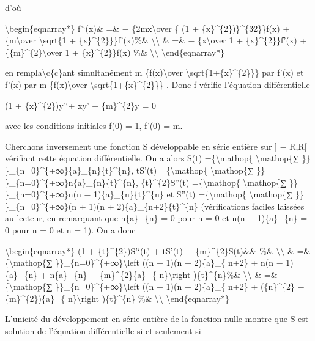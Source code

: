 \documentclass[]{article}
\begin{document}
d'où

\textbackslash{}begin\{eqnarray*\} f'`(x)\& =\& −
\{2mx\textbackslash{}over \{ (1 + \{x\}\^{}\{2\})\}\^{}\{3∕2\}\}f(x) +
\{m\textbackslash{}over \textbackslash{}sqrt\{1 +
\{x\}\^{}\{2\}\}\}f'(x)\%\& \textbackslash{}\textbackslash{} \& =\& −
\{x\textbackslash{}over 1 + \{x\}\^{}\{2\}\}f'(x) +
\{\{m\}\^{}\{2\}\textbackslash{}over 1 + \{x\}\^{}\{2\}\}f(x) \%\&
\textbackslash{}\textbackslash{} \textbackslash{}end\{eqnarray*\}

en rempla\textbackslash{}c\{c\}ant simultanément m
\{f(x)\textbackslash{}over \textbackslash{}sqrt\{1+\{x\}\^{}\{2\}\}\}
par f'(x) et f'(x) par m \{f(x)\textbackslash{}over
\textbackslash{}sqrt\{1+\{x\}\^{}\{2\}\}\} . Donc f vérifie l'équation
différentielle

(1 + \{x\}\^{}\{2\})y'`+ xy' − \{m\}\^{}\{2\}y = 0

avec les conditions initiales f(0) = 1, f'(0) = m.

Cherchons inversement une fonction S développable en série entière sur
{]} − R,R{[} vérifiant cette équation différentielle. On a alors S(t)
=\{\textbackslash{}mathop\{ \textbackslash{}mathop\{∑ \}\}
\}\_\{n=0\}\^{}\{+∞\}\{a\}\_\{n\}\{t\}\^{}\{n\}, tS'(t)
=\{\textbackslash{}mathop\{ \textbackslash{}mathop\{∑ \}\}
\}\_\{n=0\}\^{}\{+∞\}n\{a\}\_\{n\}\{t\}\^{}\{n\}, \{t\}\^{}\{2\}S''(t)
=\{\textbackslash{}mathop\{ \textbackslash{}mathop\{∑ \}\}
\}\_\{n=0\}\^{}\{+∞\}n(n − 1)\{a\}\_\{n\}\{t\}\^{}\{n\} et S''(t)
=\{\textbackslash{}mathop\{ \textbackslash{}mathop\{∑ \}\}
\}\_\{n=0\}\^{}\{+∞\}(n + 1)(n + 2)\{a\}\_\{n+2\}\{t\}\^{}\{n\}
(vérifications faciles laissées au lecteur, en remarquant que
n\{a\}\_\{n\} = 0 pour n = 0 et n(n − 1)\{a\}\_\{n\} = 0 pour n = 0 et n
= 1). On a donc

\textbackslash{}begin\{eqnarray*\} (1 + \{t\}\^{}\{2\})S'`(t) + tS'(t) −
\{m\}\^{}\{2\}S(t)\&\& \%\& \textbackslash{}\textbackslash{} \& =\&
\{\textbackslash{}mathop\{∑ \}\}\_\{n=0\}\^{}\{+∞\}\textbackslash{}left
((n + 1)(n + 2)\{a\}\_\{ n+2\} + n(n − 1)\{a\}\_\{n\} + n\{a\}\_\{n\} −
\{m\}\^{}\{2\}\{a\}\_\{ n\}\textbackslash{}right )\{t\}\^{}\{n\}\%\&
\textbackslash{}\textbackslash{} \& =\& \{\textbackslash{}mathop\{∑
\}\}\_\{n=0\}\^{}\{+∞\}\textbackslash{}left ((n + 1)(n + 2)\{a\}\_\{
n+2\} + (\{n\}\^{}\{2\} − \{m\}\^{}\{2\})\{a\}\_\{
n\}\textbackslash{}right )\{t\}\^{}\{n\} \%\&
\textbackslash{}\textbackslash{} \textbackslash{}end\{eqnarray*\}

L'unicité du développement en série entière de la fonction nulle montre
que S est solution de l'équation différentielle si et seulement si~
\end{document}
